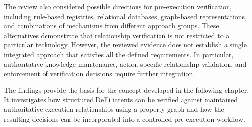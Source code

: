 The review also considered possible directions for
pre-execution verification, including rule-based registries,
relational databases, graph-based representations, and
combinations of mechanisms from different approach groups.
These alternatives demonstrate that relationship verification
is not restricted to a particular technology. However,
the reviewed evidence does not establish a single integrated
approach that satisfies all the defined requirements.
In particular, authoritative knowledge maintenance,
action-specific relationship validation, and enforcement
of verification decisions require further integration.

The findings provide the basis for the concept developed
in the following chapter. It investigates how structured
DeFi intents can be verified against maintained authoritative
execution relationships using a property graph and how
the resulting decisions can be incorporated into a
controlled pre-execution workflow.
